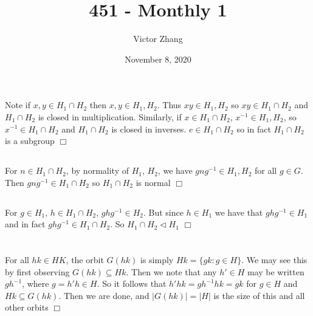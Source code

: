 \documentclass{article}
\title{451 - Monthly 1}
\author{Victor Zhang}
\date{November 8, 2020}
\begin{document}
\maketitle

\section{}
\subsection{}
Note if $x,y \in H_1 \cap H_2$ then $x,y \in H_1, H_2$. Thus $xy \in H_1, H_2$ so $xy \in H_1 \cap H_2$ and $H_1 \cap H_2$ is closed in multiplication. Similarly, if $x \in H_1 \cap H_2$, $x^{-1} \in H_1, H_2$, so $x^{-1} \in H_1 \cap H_2$ and $H_1 \cap H_2$ is closed in inverses. $e \in H_1 \cap H_2$ so in fact $H_1 \cap H_2$ is a subgroup $\Box$

\subsection{}
For $n \in H_1 \cap H_2$, by normality of $H_1$, $H_2$, we have $gng^{-1} \in H_1, H_2$ for all $g \in G$. Then $gng^{-1} \in H_1 \cap H_2$ so $H_1 \cap H_2$ is normal $\Box$

\subsection{}
For $g \in H_1$, $h \in H_1 \cap H_2$, $ghg^{-1} \in H_2$. But since $h \in H_1$ we have that $ghg^{-1} \in H_1$ and in fact $ghg^{-1} \in H_1 \cap H_2$. So $H_1 \cap H_2 \lhd H_1$ $\Box$ 

\section{}
\subsection{}
For all $hk \in HK$, the orbit $G(hk)$ is simply $Hk = \{gk : g \in H\}$. We may see this by first observing $G(hk) \subseteq Hk$. Then we note that any $h' \in H$ may be written $gh^{-1}$, where $g = h'h \in H$. So it follows that $h'hk = gh^{-1}hk = gk$ for $g \in H$ and $Hk \subseteq G(hk)$. Then we are done, and $|G(hk)| = |H|$ is the size of this and all other orbits $\Box$
\end{document}

